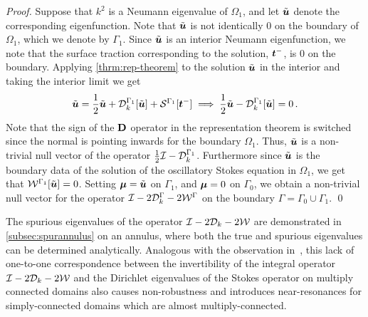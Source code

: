 
\begin{proof}
  Suppose that $k^2$ is a Neumann eigenvalue of $\Omega_{1}$, and
  let $\tilde{{\boldsymbol u}}$ denote the corresponding eigenfunction. 
  Note that $\tilde{{\boldsymbol u}}$ is not identically $0$ on the boundary
  of $\Omega_{1}$, which we denote by $\Gamma_1$.
  Since $\tilde{{\boldsymbol u}}$ is an interior Neumann eigenfunction, we note that
  the surface traction corresponding to the solution, ${\boldsymbol t}^{-}$, is $0$
  on the boundary.
  Applying \cref{thrm:rep-theorem} to the
  solution $\tilde{{\boldsymbol u}}$ in the interior
  and taking the interior limit we get
\begin{equation}
\tilde{{\boldsymbol u}} = \frac{1}{2}\tilde{{\boldsymbol u}} + {\mathcal D}^{\Gamma_{1}}_{k}[\tilde{{\boldsymbol u}}] +
{\mathcal S}^{\Gamma_{1}} [{\boldsymbol t}^{-}] \implies \frac{1}{2} \tilde{{\boldsymbol u}} - {\mathcal D}^{\Gamma_{1}}_{k}[\tilde{{\boldsymbol u}}]
= 0\, .
\end{equation}
Note that the sign of the ${\bf D}$ operator in the
representation theorem is switched since the normal
is pointing inwards for the boundary $\Omega_{1}$.
Thus, $\tilde{{\boldsymbol u}}$ is a non-trivial null vector of the operator 
$\frac{1}{2}\mathcal I - {\mathcal D}^{\Gamma_{1}}_{k}$. 
Furthermore since $\tilde{{\boldsymbol u}}$ is the boundary data of 
the solution of the oscillatory Stokes equation
in $\Omega_{1}$, we get that ${\mathcal W}^{\Gamma_{1}}[\tilde{{\boldsymbol u}}] = 0$.
Setting ${\boldsymbol \mu} = \tilde{{\boldsymbol u}}$ on $\Gamma_{1}$, and
${\boldsymbol \mu} = 0$ on $\Gamma_{0}$, we obtain a non-trivial null
vector for the operator $\mathcal I - 2{\mathcal D}^{\Gamma}_{k} -2{\mathcal W}^{\Gamma}$
on the boundary $\Gamma = \Gamma_{0} \cup \Gamma_{1}$.
\qed
\end{proof}

The spurious eigenvalues of the operator $\mathcal I-2{\mathcal D}_{k}-2{\mathcal W}$
are demonstrated in \cref{subsec:spurannulus} on an annulus,
where both the true and spurious eigenvalues can be
determined analytically. 
Analogous with the observation in~\cite{zhao2015robust},
this lack of one-to-one correspondence between
the invertibility of the integral operator $\mathcal I - 2{\mathcal D}_{k} - 2{\mathcal W}$
and the Dirichlet eigenvalues of the Stokes operator on multiply
connected domains also causes non-robustness and introduces
near-resonances for simply-connected domains which are almost
multiply-connected.

